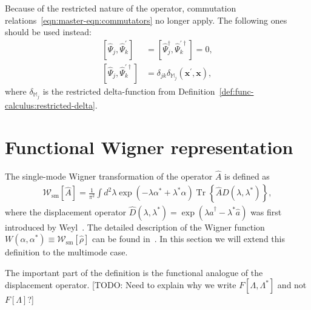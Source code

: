 \documentclass[12pt,aip,jmp,amssymb,amsmath]{revtex4-1}
\begin{document}
Because of the restricted nature of the operator, commutation relations~\ref{eqn:master-eqn:commutators} no longer apply.
The following ones should be used instead:
\begin{equation}\begin{split}
\label{eqn:func-operators:restricted-commutators}
    \left[ \hat{\Psi}_j, \hat{\Psi}_k^\prime \right]
    & = \left[ \hat{\Psi}_j^\dagger, \hat{\Psi}_k^{\prime\dagger} \right] = 0, \\
    \left[ \hat{\Psi}_j, \hat{\Psi}_k^{\prime\dagger} \right]
    & = \delta_{jk} \delta_{\mathbb{M}_j}(\boldsymbol{x}^\prime, \boldsymbol{x}),
\end{split}\end{equation}
where $\delta_{\mathbb{M}_j}$ is the restricted delta-function from Definition~\ref{def:func-calculus:restricted-delta}.



\section{Functional Wigner representation}

The single-mode Wigner transformation of the operator $\hat{A}$ is defined as
\begin{equation}\begin{split}
    \mathcal{W}_{\mathrm{sm}}[\hat{A}]
    = \frac{1}{\pi^2} \int d^2 \lambda \exp(-\lambda \alpha^* + \lambda^* \alpha)
        \operatorname{Tr} \left\{ \hat{A} \hat{D}(\lambda, \lambda^*) \right\},
\end{split}\end{equation}
where the displacement operator $\hat{D}(\lambda, \lambda^*) = \exp(\lambda \hat{a}^\dagger - \lambda^* \hat{a})$ was first introduced by Weyl~\cite{Weyl1950}.
The detailed description of the Wigner function $W(\alpha, \alpha^*) \equiv \mathcal{W}_{\mathrm{sm}}[\hat{\rho}]$ can be found in~\cite{Gardiner2004}.
In this section we will extend this definition to the multimode case.

The important part of the definition is the functional analogue of the displacement operator.
[TODO: Need to explain why we write $F[\Lambda, \Lambda^*]$ and not $F[\Lambda]$?]
\end{document}
